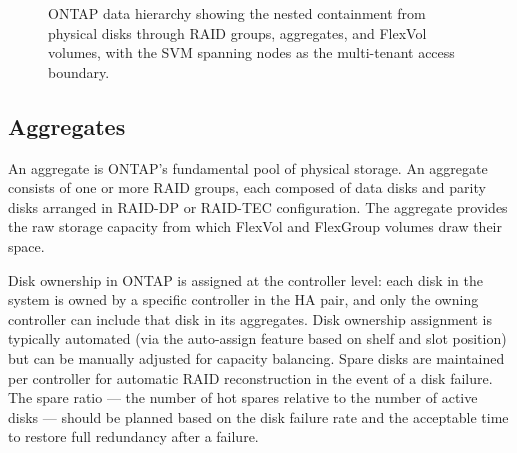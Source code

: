 \begin{figure}[htbp]
\caption{ONTAP data hierarchy showing the nested containment from physical disks through RAID groups, aggregates, and FlexVol volumes, with the SVM spanning nodes as the multi-tenant access boundary.}
\label{fig:ontap-data-hierarchy}
\end{figure}

\subsection{Aggregates}

An aggregate is ONTAP's fundamental pool of physical storage. An aggregate consists of one or more RAID groups, each composed of data disks and parity disks arranged in RAID-DP or RAID-TEC configuration. The aggregate provides the raw storage capacity from which FlexVol and FlexGroup volumes draw their space.

Disk ownership in ONTAP is assigned at the controller level: each disk in the system is owned by a specific controller in the HA pair, and only the owning controller can include that disk in its aggregates. Disk ownership assignment is typically automated (via the auto-assign feature based on shelf and slot position) but can be manually adjusted for capacity balancing. Spare disks are maintained per controller for automatic RAID reconstruction in the event of a disk failure. The spare ratio --- the number of hot spares relative to the number of active disks --- should be planned based on the disk failure rate and the acceptable time to restore full redundancy after a failure.


